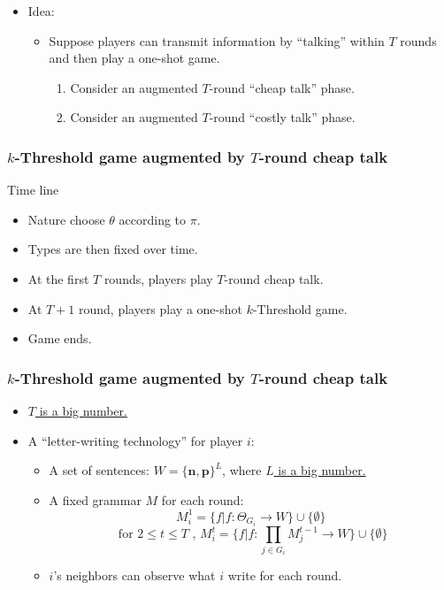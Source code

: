 \documentclass[10pt]{beamer}
\begin{document}
{\begin{itemize}
\item Idea:
\begin{itemize}
\item Suppose players can transmit information by ``talking'' within $T$ rounds and then play a one-shot game.
\begin{enumerate}
\item Consider an augmented $T$-round ``cheap talk'' phase.
\item Consider an augmented $T$-round ``costly talk'' phase.
\end{enumerate}
\end{itemize}
\end{itemize}

}

\begin{frame}
  \frametitle{$k$-Threshold game augmented by $T$-round cheap talk}

Time line
\begin{itemize}

\item Nature choose $\theta$ according to $\pi$.
\item Types are then fixed over time.
\item At the first $T$ rounds, players play $T$-round cheap talk.
\item At $T+1$ round, players play a one-shot $k$-Threshold game.
\item Game ends.
\end{itemize}

\end{frame}






\begin{frame}
  \frametitle{$k$-Threshold game augmented by $T$-round cheap talk}

\begin{itemize}
\item \underline{$T$ is a big number.}
\item A ``letter-writing technology'' for player $i$:
\begin{itemize}
\item A set of sentences: $W=\{\textbf{n},\textbf{p}\}^L$, where \underline{$L$ is a big number.}
\item A fixed grammar $M$ for each round: 
\[M^1_i=\{f|f:\Theta_{G_i}\rightarrow W\}\cup\{\emptyset\}\]
\[ \text{ for } 2\leq t \leq T\text{ , }M^{t}_i=\{f|f:\prod_{j\in G_i}M^{t-1}_j\rightarrow W\}\cup\{\emptyset\} \]
\item $i$'s neighbors can observe what $i$ write for each round.
\end{itemize}

\end{itemize}

\end{frame}
\end{document}
